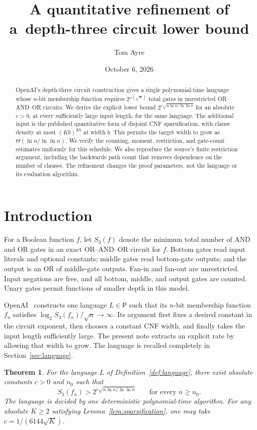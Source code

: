 \documentclass[11pt,letterpaper]{article}
\title{A quantitative refinement of a\ depth-three circuit lower bound}
\author{Tom Ayre}
\date{October 6, 2026}
\newtheorem{theorem}{Theorem}[section]
\theoremstyle{definition}
\numberwithin{equation}{section}
\begin{document}
\maketitle
\begin{abstract}
OpenAI's depth-three circuit construction gives a single polynomial-time
language whose $n$-bit membership function requires
$2^{\omega(\sqrt n)}$ total gates in unrestricted OR--AND--OR circuits.
We derive the explicit lower bound
$2^{c\sqrt{n\ln n/\ln\ln n}}$ for an absolute $c>0$, at every sufficiently
large input length, for the same language. The additional input is the
published quantitative form of disjoint CNF sparsification, with clause
density at most $(Kb)^{Kb}$ at width $b$. This permits the target width to
grow as $\Theta(\ln n/\ln\ln n)$. We verify the counting, moment, restriction,
and gate-count estimates uniformly for this schedule. We also reproduce
the source's finite restriction argument, including the backwards path
count that removes dependence on the number of clauses. The refinement
changes the proof parameters, not the language or its evaluation algorithm.
\end{abstract}

\section{Introduction}
For a Boolean function $f$, let $S_3(f)$ denote the minimum total number
of AND and OR gates in an exact OR--AND--OR circuit for $f$. Bottom gates
read input literals and optional constants; middle gates read bottom-gate
outputs; and the output is an OR of middle-gate outputs. Fan-in and
fan-out are unrestricted. Input negations are free, and all bottom,
middle, and output gates are counted. Unary gates permit functions of
smaller depth in this model.

OpenAI~\cite{OAI26} constructs one language $L\in\mathsf P$ such that its
$n$-bit membership function $f_n$ satisfies
$\log_2 S_3(f_n)/\sqrt n\to\infty$. Its argument first fixes a desired
constant in the circuit exponent, then chooses a constant CNF width, and
finally takes the input length sufficiently large. The present note
extracts an explicit rate by allowing that width to grow. The language is
recalled completely in Section~\ref{sec:language}.

\begin{theorem}\label{thm:main}
For the language $L$ of Definition~\ref{def:language}, there exist absolute
constants $c>0$ and $n_0$ such that
\begin{equation}\label{eq:main}
 S_3(f_n)>2^{c\sqrt{n\ln n/\ln\ln n}}
 \qquad\text{for every }n\ge n_0.
\end{equation}
The language is decided by one deterministic polynomial-time algorithm.
For any absolute $K\ge2$ satisfying Lemma~\ref{lem:sparsification},
one may take $c=1/(6144\sqrt K)$.
\end{theorem}
\end{document}
